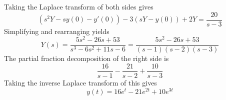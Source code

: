 \documentclass[11pt, titlepage]{article}
\begin{document}
\begin{enumerate}
        \begin{solution}
            Taking the Laplace transform of both sides gives
            \[
            (s^2 Y - sy(0) - y'(0)) - 3(sY - y(0)) + 2Y = \frac{20}{s - 3}
            \]
            Simplifying and rearranging yields
            \[
            Y(s) = \frac{5s^2 - 26s + 53}{s^3 - 6s^2 + 11s - 6} = \frac{5s^2 - 26s + 53}{(s-1) (s-2) (s-3)}
            \]
            The partial fraction decomposition of the right side is
            \[
            \frac{16}{s - 1} - \frac{21}{s - 2} + \frac{10}{s - 3}
            \]
            Taking the inverse Laplace transform of this gives
            \[
            y(t) = 16e^{t} - 21e^{2t} + 10e^{3t}
            \]
        \end{solution}

    \end{enumerate}
\end{document}
